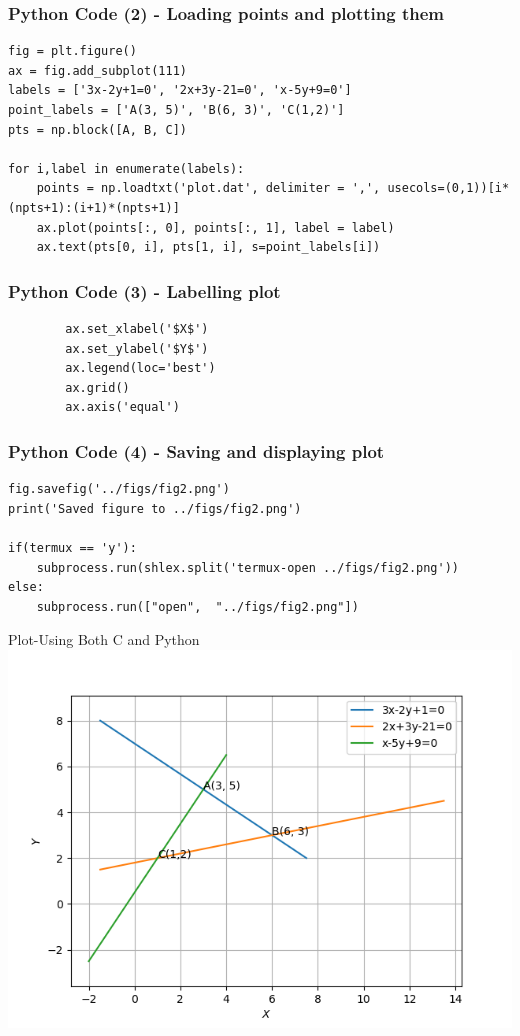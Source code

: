 \documentclass{beamer}
\begin{document}
\begin{frame}[fragile]
    \frametitle{Python Code (2) - Loading points and plotting them}
    \begin{lstlisting}
fig = plt.figure()
ax = fig.add_subplot(111)
labels = ['3x-2y+1=0', '2x+3y-21=0', 'x-5y+9=0']
point_labels = ['A(3, 5)', 'B(6, 3)', 'C(1,2)']
pts = np.block([A, B, C])

for i,label in enumerate(labels):
    points = np.loadtxt('plot.dat', delimiter = ',', usecols=(0,1))[i*(npts+1):(i+1)*(npts+1)]
    ax.plot(points[:, 0], points[:, 1], label = label)
    ax.text(pts[0, i], pts[1, i], s=point_labels[i])
\end{lstlisting}
\end{frame}

\begin{frame}[fragile]
    \frametitle{Python Code (3) - Labelling plot}
    \begin{lstlisting}
        ax.set_xlabel('$X$')
        ax.set_ylabel('$Y$')
        ax.legend(loc='best')
        ax.grid() 
        ax.axis('equal')
    \end{lstlisting}
\end{frame}

\begin{frame}[fragile]
    \frametitle{Python Code (4) - Saving and displaying plot}
    \begin{lstlisting}
fig.savefig('../figs/fig2.png')
print('Saved figure to ../figs/fig2.png')

if(termux == 'y'):
    subprocess.run(shlex.split('termux-open ../figs/fig2.png'))
else:
    subprocess.run(["open",  "../figs/fig2.png"])
\end{lstlisting}
\end{frame}

\begin{frame}{Plot-Using Both C and Python}
    \centering
    \includegraphics[width=\columnwidth, height=0.8\textheight, keepaspectratio]{../figs/fig2.png}     
\end{frame}
\end{document}
